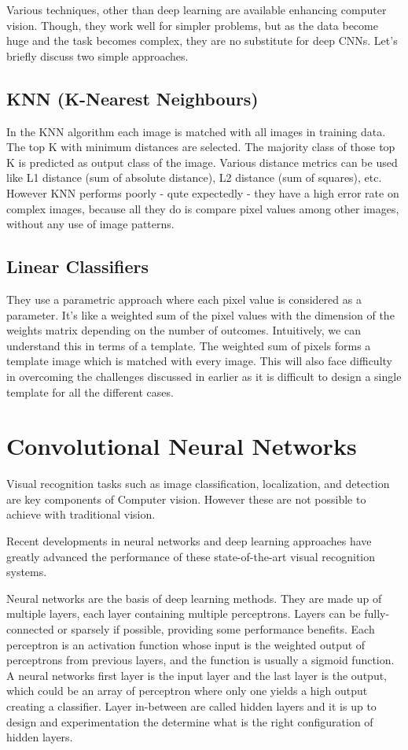 Various techniques, other than deep learning are available enhancing computer
vision. Though, they work well for simpler problems, but as the data become huge
and the task becomes complex, they are no substitute for deep CNNs. Let’s
briefly discuss two simple approaches.

\subsection{KNN (K-Nearest Neighbours)}

In the KNN algorithm each image is matched with all images in training data. The
top K with minimum distances are selected. The majority class of those top K is
predicted as output class of the image. Various distance metrics can be used
like L1 distance (sum of absolute distance), L2 distance (sum of squares), etc.
However KNN performs poorly - qute expectedly - they have a high error rate on
complex images, because all they do is compare pixel values among other images,
without any use of image patterns.

\subsection{Linear Classifiers}

They use a parametric approach where each pixel value is considered as a
parameter. It’s like a weighted sum of the pixel values with the dimension of
the weights matrix depending on the number of outcomes. Intuitively, we can
understand this in terms of a template. The weighted sum of pixels forms a
template image which is matched with every image. This will also face difficulty
in overcoming the challenges discussed in earlier as it is difficult to design a
single template for all the different cases.

\section{Convolutional Neural Networks}

Visual recognition tasks such as image classification, localization, and
detection are key components of Computer vision. However these are not possible
to achieve with traditional vision.

Recent developments in neural networks and deep learning approaches have greatly
advanced the performance of these state-of-the-art visual recognition systems.

Neural networks are the basis of deep learning methods. They are made up of
multiple layers, each layer containing multiple perceptrons. Layers can be
fully-connected or sparsely if possible, providing some performance benefits.
Each perceptron is an activation function whose input is the weighted output of
perceptrons from previous layers, and the function is usually a sigmoid
function. A neural networks first layer is the input layer and the last layer is
the output, which could be an array of perceptron where only one yields a high
output creating a classifier. Layer in-between are called hidden layers and it
is up to design and experimentation the determine what is the right
configuration of hidden layers.

